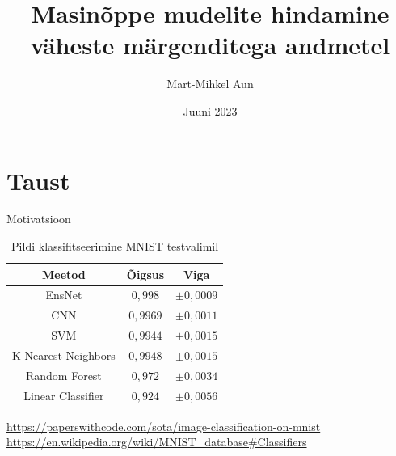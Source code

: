 \documentclass{beamer}
\title{Masinõppe mudelite hindamine väheste märgenditega andmetel}
\author{Mart-Mihkel Aun}
\date{Juuni 2023}
\begin{document}

\frame{\titlepage}

\section{Taust}

\begin{frame}{Motivatsioon}
    \begin{table}[H]
        \caption{Pildi klassifitseerimine MNIST testvalimil}
        \begin{tabular}{c|c|>{\onslide<2->}c<{\onslide}}
            Meetod              & Õigsus     & Viga           \\ \hline
            EnsNet              & $0{,}998$  & $\pm 0{,}0009$ \\
            CNN                 & $0{,}9969$ & $\pm 0{,}0011$ \\
        	SVM                 & $0{,}9944$ & $\pm 0{,}0015$ \\
        	K-Nearest Neighbors & $0{,}9948$ & $\pm 0{,}0015$ \\
        	Random Forest       & $0{,}972$  & $\pm 0{,}0034$ \\
            Linear Classifier   & $0{,}924$  & $\pm 0{,}0056$ \\
        \end{tabular}
    \end{table}

    \centering
    \tiny{\url{https://paperswithcode.com/sota/image-classification-on-mnist}}
    \tiny{\url{https://en.wikipedia.org/wiki/MNIST_database#Classifiers}}
\end{frame}
\end{document}
